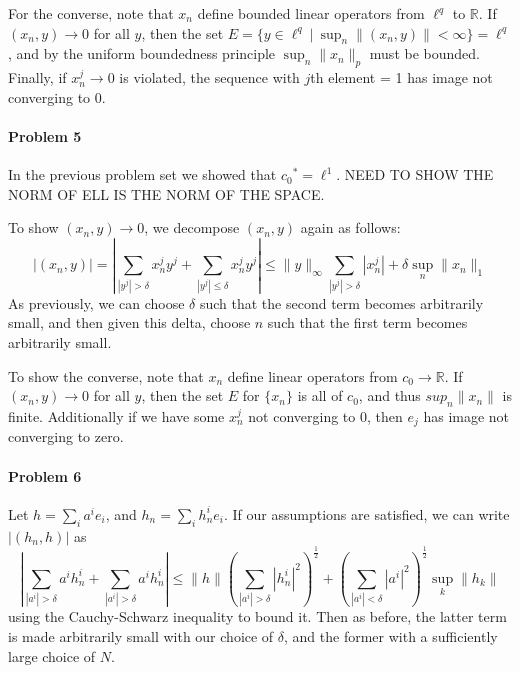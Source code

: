 \documentclass[12pt]{article}
\begin{document}
For the converse, note that $x_n$ define bounded linear operators from $\ell^q$ to
$\mathbb{R}$. If $(x_n,y)\to 0$ for all $y$, then the set $E = \{y\in\ell^q\ |
\ \sup_n\|(x_n,y)\| < \infty\} = \ell^q$, and by the uniform boundedness principle
$\sup_n\|x_n\|_{p}$ must be bounded. Finally,
if $x_n^j \to 0$ is violated, the sequence with $j$th element = 1 has image not 
converging to 0.

\paragraph{Problem 5}

In the previous problem set we showed that ${c_0}^* = \ell^1$. NEED TO SHOW
THE NORM OF ELL IS THE NORM OF THE SPACE.

To show $(x_n,y)\to 0$, we decompose $(x_n,y)$ again as follows:
\begin{displaymath}
  |(x_n,y)| =
  |\sum_{|y^j|>\delta}x_n^jy^j + \sum_{|y^j|\leq \delta}x_n^jy^j|
  \leq \|y\|_\infty\sum_{|y^j|>\delta}|x_n^j| + \delta \sup_n\|x_n\|_1
\end{displaymath}
As previously, we can choose $\delta$ such that the second term becomes
arbitrarily small, and then given this delta, choose $n$ such that the first
term becomes arbitrarily small.

To show the converse, note that $x_n$ define linear operators from $c_0 \to
\mathbb{R}$. If $(x_n,y)\to 0$ for all $y$, then the set $E$ for $\{x_n\}$ is
all of $c_0$, and thus $sup_n\|x_n\|$ is finite. Additionally if we have some
$x_n^j$ not converging to $0$, then $e_j$ has image not converging to zero.

\paragraph{Problem 6}

Let $h = \sum_ia^ie_i$, and $h_n = \sum_ih_n^ie_i$. If our assumptions are
satisfied, we can write $|(h_n,h)|$ as
\begin{displaymath}
  |\sum_{|a^i|>\delta}a^ih_n^i + \sum_{|a^i|>\delta}a^ih_n^i| \leq
  \|h\|\left(\sum_{|a^i|>\delta}|h_n^i|^2\right)^{\frac{1}{2}} +
  \left(\sum_{|a^i|<\delta}|a^i|^2\right)^{\frac{1}{2}}\sup_k\|h_k\|
\end{displaymath}
using the Cauchy-Schwarz inequality to bound it. Then as before, the latter
term is made arbitrarily small with our choice of $\delta$, and the former
with a sufficiently large choice of $N$.
\end{document}
